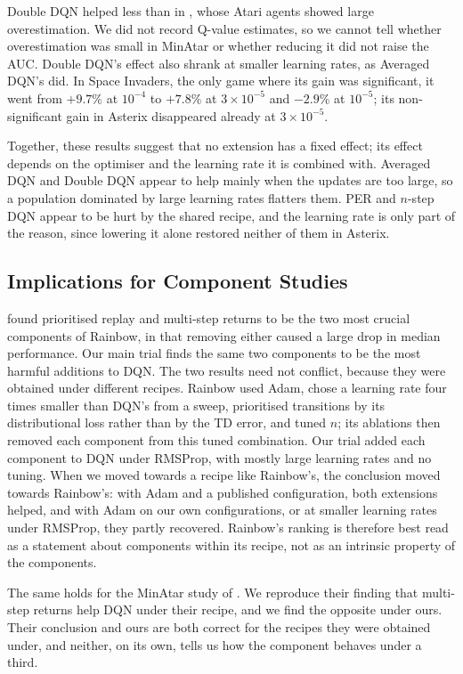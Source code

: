 \documentclass[conference,a4paper]{IEEEtran}
\begin{document}
Double DQN helped less than in \citet{vanhasselt2016deep}, whose Atari agents showed large overestimation. We did not
record Q-value estimates, so we cannot tell whether overestimation was small in MinAtar or whether reducing it did not
raise the AUC. Double DQN's effect also shrank at smaller learning rates, as Averaged DQN's did. In
Space Invaders, the only game where its gain was significant, it went from $+9.7\%$ at $10^{-4}$ to $+7.8\%$ at
$3\times10^{-5}$ and $-2.9\%$ at $10^{-5}$; its non-significant gain in Asterix disappeared already at $3\times10^{-5}$.

Together, these results suggest that no extension has a fixed effect; its effect depends on the optimiser and the
learning rate it is combined with. Averaged DQN and Double DQN appear to help mainly when the updates are too large, so
a population dominated by large learning rates flatters them. PER and $n$-step DQN appear to be hurt by the shared
recipe, and the learning rate is only part of the reason, since lowering it alone restored neither of them in
Asterix.

\subsection{Implications for Component Studies}\label{sec:literature}
\citet{hessel2018rainbow} found prioritised replay and multi-step returns to be the two most crucial components of
Rainbow, in that removing either caused a large drop in median performance. Our main trial finds the same two
components to be the most harmful additions to DQN. The two results need not conflict, because they were obtained
under different recipes. Rainbow used Adam, chose a learning rate four times smaller than DQN's from a sweep,
prioritised transitions by its distributional loss rather than by the TD error, and tuned $n$; its ablations then
removed each component from this tuned combination. Our trial added each component to DQN under RMSProp, with mostly
large learning rates and no tuning. When we moved towards a recipe like Rainbow's, the conclusion moved towards
Rainbow's: with Adam and a published configuration, both extensions helped, and with Adam on our own configurations,
or at smaller learning rates under RMSProp, they partly recovered.
Rainbow's ranking is therefore best read as a statement about components within its recipe, not as an intrinsic
property of the components.

The same holds for the MinAtar study of \citet{obandoceron2021revisiting}. We reproduce their finding that multi-step
returns help DQN under their recipe, and we find the opposite under ours. Their conclusion and ours are both correct
for the recipes they were obtained under, and neither, on its own, tells us how the component behaves under a third.
\end{document}
